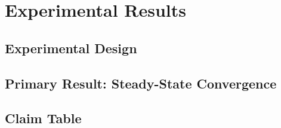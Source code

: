 
\chapter{Experimental Results}
\label{vol1:chap:results}


\section{Experimental Design}
\label{vol1:sec:results:design}


\section{Primary Result: Steady-State Convergence}
\label{vol1:sec:results:primary}


\section{Claim Table}
\label{vol1:sec:results:claims}


